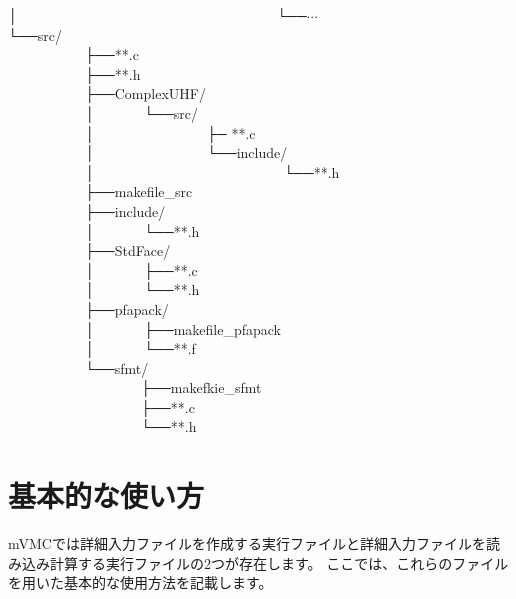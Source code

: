 │~~~~~~~~~~~~~~~~~~~~~~~~~~~~~~~~~~~~~└──$\cdots$\\
└──src/\\
~~~~~~~~~~~├──**.c\\
~~~~~~~~~~~├──**.h\\
~~~~~~~~~~~├──ComplexUHF/\\
~~~~~~~~~~~│~~~~~~~└──src/\\
~~~~~~~~~~~│~~~~~~~~~~~~~~~~├─ **.c\\
~~~~~~~~~~~│~~~~~~~~~~~~~~~~└──include/\\
~~~~~~~~~~~│~~~~~~~~~~~~~~~~~~~~~~~~~~~└──**.h\\
~~~~~~~~~~~├──makefile\_src\\
~~~~~~~~~~~├──include/\\
~~~~~~~~~~~│~~~~~~~└──**.h\\
~~~~~~~~~~~├──StdFace/\\
~~~~~~~~~~~│~~~~~~~├──**.c\\
~~~~~~~~~~~│~~~~~~~└──**.h\\
~~~~~~~~~~~├──pfapack/\\
~~~~~~~~~~~│~~~~~~~├──makefile\_pfapack\\
~~~~~~~~~~~│~~~~~~~└──**.f\\
~~~~~~~~~~~└──sfmt/\\
~~~~~~~~~~~~~~~~~~~├──makefkie\_sfmt\\
~~~~~~~~~~~~~~~~~~~├──**.c\\
~~~~~~~~~~~~~~~~~~~└──**.h\\

\newpage
\section{基本的な使い方}

{mVMCでは詳細入力ファイルを作成する実行ファイルと詳細入力ファイルを読み込み計算する実行ファイルの2つが存在します。
ここでは、これらのファイルを用いた基本的な使用方法を記載します。}

